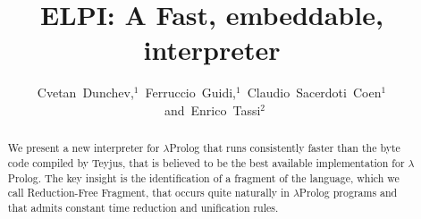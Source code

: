 \documentclass{llncs}
\begin{document}
\title{ELPI: A Fast, embeddable, \lp{} interpreter}





\author{Cvetan~Dunchev,$^1$~Ferruccio~Guidi,$^1$~Claudio~Sacerdoti~Coen$^1$~and~Enrico~Tassi$^2$}






\newcommand{\frag}{Reduction-Free Fragment}
\newcommand{\lp}{$\lambda$Prolog}
\newcommand{\Ll}{\ensuremath{\mathcal{L}_\lambda}}
\newcommand{\elpi}{ELPI}
\newcommand{\tedius}{Teyjus}
\newcommand{\CSC}[1]{\textcolor{red}{#1}}
\newcommand{\FG}[1]{\textcolor{magenta}{#1}}

\maketitle

\begin{abstract}
We present a new interpreter for \lp{} that runs consistently faster than
the byte code compiled by \tedius{}, that is believed to be the best
available implementation for \lp. 
The key insight is the identification of a fragment of
the language, which we call \frag{}, that occurs quite naturally in \lp{}
programs and that admits constant time reduction and unification rules.
\end{abstract}
\end{document}
